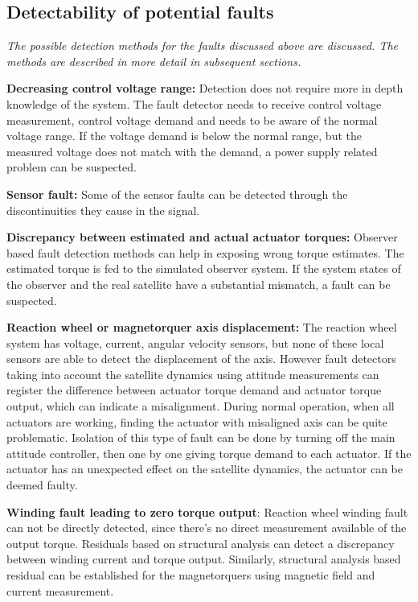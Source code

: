 \subsection{Detectability of potential faults}

\textit{The possible detection methods for the faults discussed above are discussed. The methods are described in more detail in subsequent sections.}

\textbf{Decreasing control voltage range:}
Detection does not require more in depth knowledge of the system. The fault detector needs to receive control voltage measurement, control voltage demand and needs to be aware of the normal voltage range. If the voltage demand is below the normal range, but the measured voltage does not match with the demand, a power supply related problem can be suspected.

\textbf{Sensor fault:}
Some of the sensor faults can be detected through the discontinuities they cause in the signal.

\textbf{Discrepancy between estimated and actual actuator torques:}
Observer based fault detection methods can help in exposing wrong torque estimates. The estimated torque is fed to the simulated observer system. If the system states of the observer and the real satellite have a substantial mismatch, a fault can be suspected.

\textbf{Reaction wheel or magnetorquer axis displacement:}
The reaction wheel system has voltage, current, angular velocity sensors, but none of these local sensors are able to detect the displacement of the axis. However fault detectors taking into account the satellite dynamics using attitude measurements can register the difference between actuator torque demand and actuator torque output, which can indicate a misalignment. During normal operation, when all actuators are working, finding the actuator with misaligned axis can be quite problematic. Isolation of this type of fault can be done by turning off the main attitude controller, then one by one giving torque demand to each actuator. If the actuator has an unexpected effect on the satellite dynamics, the actuator can be deemed faulty. 

\textbf{Winding fault leading to zero torque output}:
Reaction wheel winding fault can not be directly detected, since there's no direct measurement available of the output torque. Residuals based on structural analysis can detect a discrepancy between winding current and torque output. Similarly, structural analysis based residual can be established for the magnetorquers using magnetic field and current measurement.

